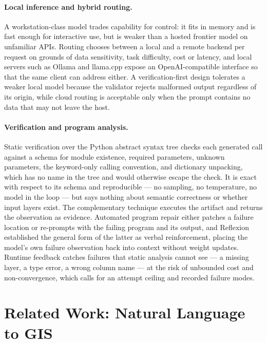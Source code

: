 \paragraph{Local inference and hybrid routing.} A workstation-class model trades
capability for control: it fits in memory and is fast enough for interactive
use, but is weaker than a hosted frontier model on unfamiliar APIs. Routing
chooses between a local and a remote backend per request on grounds of data
sensitivity, task difficulty, cost or latency, and local servers such as Ollama
and llama.cpp expose an OpenAI-compatible interface so that the same client can
address either. A verification-first design tolerates a weaker local model
because the validator rejects malformed output regardless of its origin, while
cloud routing is acceptable only when the prompt contains no data that may not
leave the host.

\paragraph{Verification and program analysis.} Static verification over the
Python abstract syntax tree \cite{astech} checks each generated call against a
schema for module existence, required parameters, unknown parameters, the
keyword-only calling convention, and dictionary unpacking, which has no name in
the tree and would otherwise escape the check. It is exact with respect to its
schema and reproducible --- no sampling, no temperature, no model in the loop
--- but says nothing about semantic correctness or whether input layers exist.
The complementary technique executes the artifact and returns the observation
as evidence. Automated program repair either patches a failure location
\cite{gazzola2019automatic} or re-prompts with the failing program and its
output, and Reflexion \cite{shinn2023reflexion} established the general form of
the latter as verbal reinforcement, placing the model's own failure observation
back into context without weight updates. Runtime feedback catches failures that
static analysis cannot see --- a missing layer, a type error, a wrong column
name --- at the risk of unbounded cost and non-convergence, which calls for an
attempt ceiling and recorded failure modes.

\section{Related Work: Natural Language to GIS}
\label{sec:bg:related}

